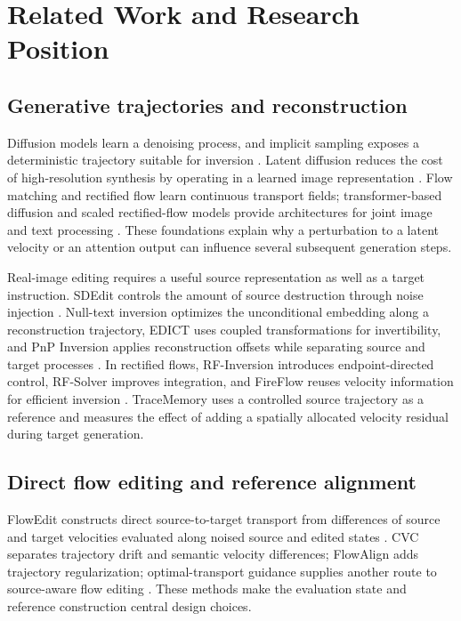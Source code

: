 \section{Related Work and Research Position}
\label{sec:related}
\subsection{Generative trajectories and reconstruction}
Diffusion models learn a denoising process, and implicit sampling exposes a deterministic trajectory suitable for inversion \cite{ho2020ddpm,song2021ddim}. Latent diffusion reduces the cost of high-resolution synthesis by operating in a learned image representation \cite{rombach2022ldm}. Flow matching and rectified flow learn continuous transport fields; transformer-based diffusion and scaled rectified-flow models provide architectures for joint image and text processing \cite{lipman2023flowmatching,liu2023rectifiedflow,peebles2023dit,esser2024sd3}. These foundations explain why a perturbation to a latent velocity or an attention output can influence several subsequent generation steps.

Real-image editing requires a useful source representation as well as a target instruction. SDEdit controls the amount of source destruction through noise injection \cite{meng2022sdedit}. Null-text inversion optimizes the unconditional embedding along a reconstruction trajectory, EDICT uses coupled transformations for invertibility, and PnP Inversion applies reconstruction offsets while separating source and target processes \cite{mokady2023nulltext,wallace2023edict,ju2024pnpinversion}. In rectified flows, RF-Inversion introduces endpoint-directed control, RF-Solver improves integration, and FireFlow reuses velocity information for efficient inversion \cite{rout2025rfinversion,wang2025rfsolver,deng2025fireflow}. TraceMemory uses a controlled source trajectory as a reference and measures the effect of adding a spatially allocated velocity residual during target generation.

\subsection{Direct flow editing and reference alignment}
FlowEdit constructs direct source-to-target transport from differences of source and target velocities evaluated along noised source and edited states \cite{kulikov2025flowedit}. CVC separates trajectory drift and semantic velocity differences; FlowAlign adds trajectory regularization; optimal-transport guidance supplies another route to source-aware flow editing \cite{li2025cvc,kim2025flowalign,lupascu2026otrf}. These methods make the evaluation state and reference construction central design choices.


